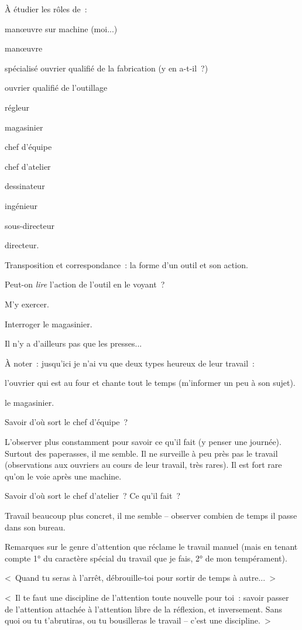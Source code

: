 \documentclass[french,twoside]{book} %
\begin{document}
À étudier les rôles de :\par
manœuvre sur machine (moi...)\par
manœuvre\par
spécialisé ouvrier qualifié de la fabrication (y en a-t-il ?)\par
ouvrier qualifié de l'outillage\par
régleur\par
magasinier\par
chef d'équipe\par
chef d'atelier\par
dessinateur\par
ingénieur\par
sous-directeur\par
directeur.\par
Transposition et correspondance : la forme d'un outil et son action.\par
Peut-on {\itshape lire} l'action de l'outil en le voyant ?\par
M’y exercer.\par
Interroger le magasinier.\par
Il n'y a d'ailleurs pas que les presses...\par
À noter : jusqu'ici je n'ai vu que deux types heureux de leur travail :\par
\par
l'ouvrier qui est au four et chante tout le temps (m'informer un peu à son sujet).\par
le magasinier.\par
Savoir d'où sort le chef d'équipe ?\par
L'observer plus constamment pour savoir ce qu'il fait (y penser une journée). Surtout des paperasses, il me semble. Il ne surveille à peu près pas le travail (observations aux ouvriers au cours de leur travail, très rares). Il est fort rare qu'on le voie après une machine.\par
Savoir d'où sort le chef d'atelier ? Ce qu'il fait ?\par
Travail beaucoup plus concret, il me semble – observer combien de temps il passe dans son bureau.\par
Remarques sur le genre d'attention que réclame le travail manuel (mais en tenant compte 1° du caractère spécial du travail que je fais, 2° de mon tempérament).\par
< Quand tu seras à l'arrêt, débrouille-toi pour sortir de temps à autre... >\par
< Il te faut une discipline de l'attention toute nouvelle pour toi : savoir passer de l'attention attachée à l'attention libre de la réflexion, et inversement. Sans quoi ou tu t'abrutiras, ou tu bousilleras le travail – c'est une discipline. >\par
\end{document}
